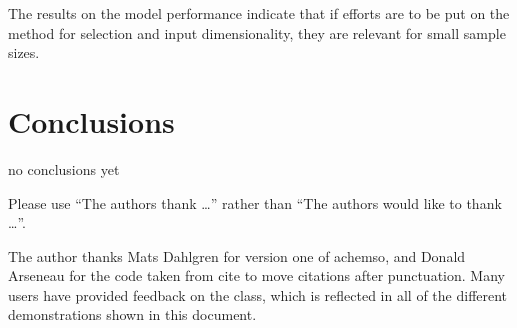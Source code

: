\documentclass[journal=ancham,manuscript=article]{achemso}
\begin{document}
The results on the model performance indicate that if efforts are to be put on the method for selection and input dimensionality, they are relevant for small sample sizes. 




\section*{Conclusions}\label{conclusions}
no conclusions yet


\begin{acknowledgement}

Please use ``The authors thank \ldots'' rather than ``The
authors would like to thank \ldots''.

The author thanks Mats Dahlgren for version one of \textsf{achemso},
and Donald Arseneau for the code taken from \textsf{cite} to move
citations after punctuation. Many users have provided feedback on the
class, which is reflected in all of the different demonstrations
shown in this document.

\end{acknowledgement}





\end{document}

